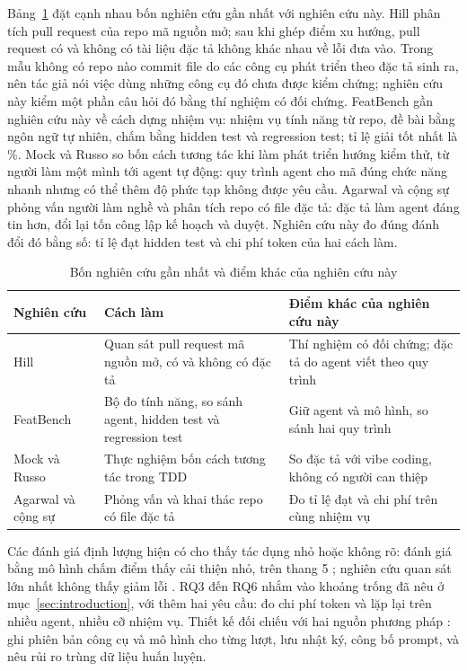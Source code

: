 Bảng~\ref{tab:closest} đặt cạnh nhau bốn nghiên cứu gần nhất với nghiên cứu này. Hill \cite{hill_2026} phân tích
\NumLitHillPRs{} pull request của \NumLitHillRepos{} repo mã nguồn mở; sau khi ghép điểm xu hướng, pull
request có và không có tài liệu đặc tả không khác nhau về lỗi đưa vào. Trong mẫu không có repo nào commit file do các
công cụ phát triển theo đặc tả sinh ra, nên tác giả nói việc dùng những công cụ đó chưa được kiểm chứng; nghiên
cứu này kiểm một phần câu hỏi đó bằng thí nghiệm có đối chứng. FeatBench \cite{chen_2025} gần nghiên cứu này về cách dựng nhiệm vụ:
\NumLitChenTasks{} nhiệm vụ tính năng từ \NumLitChenRepos{} repo, đề bài bằng ngôn ngữ tự nhiên, chấm bằng
hidden test và regression test; tỉ lệ giải tốt nhất là \NumLitChenBestPct{}\%. Mock và Russo \cite{mock_2026} so
bốn cách tương tác khi làm phát triển hướng kiểm thử, từ người làm một mình tới agent tự động: quy trình
agent cho mã đúng chức năng nhanh nhưng có thể thêm độ phức tạp không được yêu cầu. Agarwal và cộng sự
\cite{agarwal_2026} phỏng vấn \NumLitAgarwalInterviews{} người làm nghề và phân tích \NumLitAgarwalRepos{}
repo có file đặc tả: đặc tả làm agent đáng tin hơn, đổi lại tốn công lập kế hoạch và duyệt. Nghiên cứu này đo
đúng đánh đổi đó bằng số: tỉ lệ đạt hidden test và chi phí token của hai cách làm.

\begin{table}[H]
\centering\small
\caption{Bốn nghiên cứu gần nhất và điểm khác của nghiên cứu này}\label{tab:closest}
\begin{tabularx}{\linewidth}{@{}lXX@{}}
\toprule
Nghiên cứu & Cách làm & Điểm khác của nghiên cứu này \\
\midrule
Hill \cite{hill_2026} & Quan sát pull request mã nguồn mở, có và không có đặc tả & Thí nghiệm có đối chứng; đặc tả
do agent viết theo quy trình \\
FeatBench \cite{chen_2025} & Bộ đo tính năng, so sánh agent, hidden test và regression test & Giữ agent và mô hình, so sánh
hai quy trình \\
Mock và Russo \cite{mock_2026} & Thực nghiệm bốn cách tương tác trong TDD & So đặc tả với vibe coding, không có người
can thiệp \\
Agarwal và cộng sự \cite{agarwal_2026} & Phỏng vấn và khai thác repo có file đặc tả & Đo tỉ lệ đạt và chi phí trên cùng nhiệm
vụ \\
\bottomrule
\end{tabularx}
\end{table}

Các đánh giá định lượng hiện có cho thấy tác dụng nhỏ hoặc không rõ: đánh giá bằng mô hình chấm điểm
thấy cải thiện nhỏ, \NumLitTaghaviGain{} trên thang 5 \cite{taghavi_2026}; nghiên cứu quan sát lớn nhất
không thấy giảm lỗi \cite{hill_2026}. RQ3 đến RQ6 nhắm vào khoảng trống đã nêu ở mục~\ref{sec:introduction},
với thêm hai yêu cầu: đo chi phí token và lặp lại trên nhiều agent, nhiều cỡ nhiệm vụ. Thiết kế đối chiếu với hai nguồn phương pháp
\cite{baltes_2025,sallou_2024}: ghi phiên bản công cụ và mô hình cho từng lượt, lưu nhật ký, công bố
prompt, và nêu rủi ro trùng dữ liệu huấn luyện.
